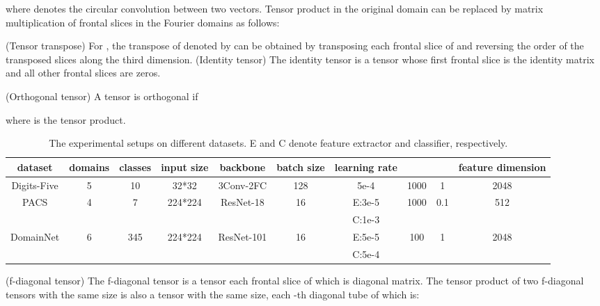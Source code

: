 \documentclass[10pt,twocolumn,letterpaper]{article}
\begin{document}
where  denotes the circular convolution between two vectors. Tensor product in the original domain can be replaced by matrix multiplication of frontal slices in the Fourier domains as follows:

{ (Tensor transpose) For , the transpose of  denoted by  can be obtained by transposing each frontal slice of  and reversing the order of the transposed slices along the third dimension.}
{ (Identity tensor) The identity tensor  is a tensor whose first frontal slice is the  identity matrix and all other frontal slices are zeros.}
{ (Orthogonal tensor) A tensor  is orthogonal if 

where  is the tensor product.}
\begin{table*}[t]
	\begin{tabular}{clccccccccc}
		\hline
		\multicolumn{2}{c}{dataset}                    & domains            & classes              & input size               & backbone                    & batch size          & learning rate              &                 &                    & feature dimension     \\ \hline
		\multicolumn{2}{c}{Digits-Five}                & 5                  & 10                   & 32*32                    & 3Conv-2FC                   & 128                 & 5e-4                       & 1000                  & 1                    & 2048                  \\
		\multicolumn{2}{c}{\multirow{2}{*}{PACS}}      & \multirow{2}{*}{4} & \multirow{2}{*}{7}   & \multirow{2}{*}{224*224} & \multirow{2}{*}{ResNet-18}  & \multirow{2}{*}{16} & E:3e-5                     & \multirow{2}{*}{1000} & \multirow{2}{*}{0.1} & \multirow{2}{*}{512}  \\
		\multicolumn{2}{c}{}                           &                    &                      &                          &                             &                     & C:1e-3                     &                       &                      &                       \\
		\multicolumn{2}{c}{\multirow{2}{*}{DomainNet}} & \multirow{2}{*}{6} & \multirow{2}{*}{345} & \multirow{2}{*}{224*224} & \multirow{2}{*}{ResNet-101} & \multirow{2}{*}{16} & E:5e-5                     & \multirow{2}{*}{100}  & \multirow{2}{*}{1}   & \multirow{2}{*}{2048} \\
		\multicolumn{2}{c}{}                           &                    &                      &                          &                             &                     & {C:5e-4} &                       &                      &                       \\ \hline	
	\end{tabular}
	\caption{The experimental setups on different datasets. E and C denote feature extractor and classifier, respectively.}
	\label{tab5}
\end{table*}
{ (f-diagonal tensor) The f-diagonal tensor is a tensor each frontal slice of which is diagonal matrix. The tensor product of two f-diagonal tensors with the same size  is also a tensor with the same size, each -th  diagonal tube of which is:

}
\end{document}
